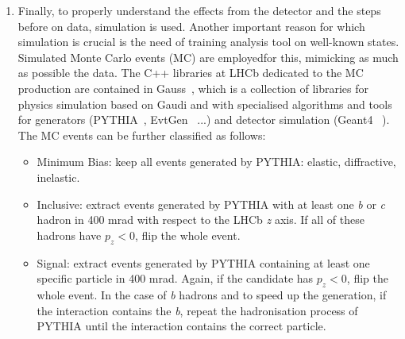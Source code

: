 \begin{enumerate}
\item Finally, to properly understand the effects from the detector and the steps before on data, simulation is used. Another important reason for which simulation is crucial is the need of training analysis tool on well-known states.
Simulated Monte Carlo events (MC) are employedfor this, mimicking as much as possible the data. The C++ libraries at LHCb dedicated to the MC production
are contained in Gauss~\cite{Gauss}, which is a collection of libraries for physics simulation based on Gaudi and with specialised algorithms and tools for generators (PYTHIA~\cite{Sjostrand:2007gs}, EvtGen~\cite{Ryd:2005zz} ...) and detector simulation (Geant4 ~\cite{Agostinelli2003250}).
The MC events can be further classified as follows:
\begin{itemize}
\item Minimum Bias: keep all events generated by PYTHIA: elastic, diffractive, inelastic.
\item Inclusive: extract events generated by PYTHIA with at least one \textit{b} or \textit{c} hadron in 400 mrad with respect to the LHCb \textit{z} axis. If all of these hadrons have $p_z < 0$, flip the whole event.
\item Signal: extract events generated by PYTHIA containing at least one specific particle in 400 mrad. Again, if the candidate has $p_z < 0$, flip the whole event. In the case of \textit{b} hadrons and to speed up the generation, if the interaction contains the \textit{b}, repeat the hadronisation process of PYTHIA until the interaction contains the correct particle.
\end{itemize}
\end{enumerate}


		
